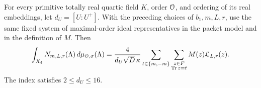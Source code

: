\begin{lemma}\label{lem:end-unfold}
For every primitive totally real quartic field $K$, order $\mathcal O$, and
ordering of its real embeddings, let $d_U=[U:U^+]$.  With the preceding
choices of $b_1,m,L,r$, use the same fixed system of maximal-order ideal
representatives in the packet model and in the definition of $M$.  Then
\begin{equation}\label{eq:end-unfold}
 \int_{X_4}N_{m,L,r}(\Lambda)\,d\mu_{\mathcal O,\sigma}(\Lambda)
 =\frac{4}{d_U\sqrt D\,\kappa}
       \sum_{t\in\{m,-m\}}
       \sum_{\substack{z\in F\\\operatorname{Tr} z=t}}
          M(z)\mathcal L_{L,r}(z).
\end{equation}
The index satisfies $2\le d_U\le16$.
\end{lemma}


